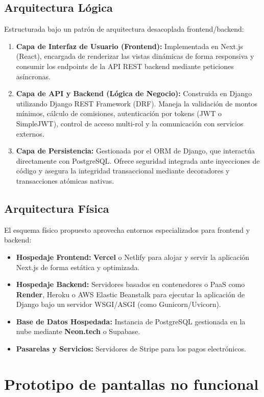 \documentclass[12pt,spanish,a4paper]{report}
\begin{document}
\subsection*{Arquitectura Lógica}
Estructurada bajo un patrón de arquitectura desacoplada frontend/backend:
\begin{enumerate}
    \item \textbf{Capa de Interfaz de Usuario (Frontend):} Implementada en Next.js (React), encargada de renderizar las vistas dinámicas de forma responsiva y consumir los endpoints de la API REST backend mediante peticiones asíncronas.
    \item \textbf{Capa de API y Backend (Lógica de Negocio):} Construida en Django utilizando Django REST Framework (DRF). Maneja la validación de montos mínimos, cálculo de comisiones, autenticación por tokens (JWT o SimpleJWT), control de acceso multi-rol y la comunicación con servicios externos.
    \item \textbf{Capa de Persistencia:} Gestionada por el ORM de Django, que interactúa directamente con PostgreSQL. Ofrece seguridad integrada ante inyecciones de código y asegura la integridad transaccional mediante decoradores y transacciones atómicas nativas.
\end{enumerate}

\subsection*{Arquitectura Física}
El esquema físico propuesto aprovecha entornos especializados para frontend y backend:
\begin{itemize}
    \item \textbf{Hospedaje Frontend:} \textbf{Vercel} o Netlify para alojar y servir la aplicación Next.js de forma estática y optimizada.
    \item \textbf{Hospedaje Backend:} Servidores basados en contenedores o PaaS como \textbf{Render}, Heroku o AWS Elastic Beanstalk para ejecutar la aplicación de Django bajo un servidor WSGI/ASGI (como Gunicorn/Uvicorn).
    \item \textbf{Base de Datos Hospedada:} Instancia de PostgreSQL gestionada en la nube mediante \textbf{Neon.tech} o Supabase.
    \item \textbf{Pasarelas y Servicios:} Servidores de Stripe para los pagos electrónicos.
\end{itemize}

\section{Prototipo de pantallas no funcional}
\end{document}
